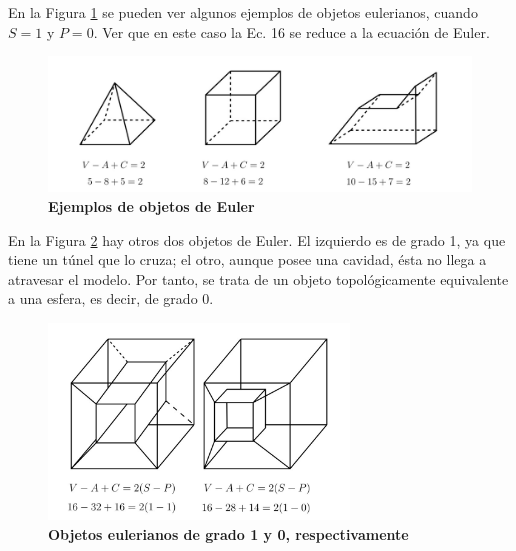 En la Figura \ref{fig:euler1} se pueden ver algunos ejemplos de objetos eulerianos, cuando $S = 1$ y $P = 0$. Ver que en este caso la Ec. 16 se reduce a la ecuación de Euler.

\begin{figure}[h]
\includegraphics[width=14cm]{Img/GEO/geo-euler1.jpg}
\centering
\caption{\textbf{{Ejemplos de objetos de Euler}}}
\label{fig:euler1}
\end{figure}


En la Figura \ref{fig:euler2} hay otros dos objetos de Euler. El izquierdo es de grado 1, ya que tiene un túnel que lo cruza; el otro, aunque posee una cavidad, ésta no llega a atravesar el modelo. Por tanto, se trata de un objeto topológicamente equivalente a una esfera, es decir, de grado 0.

\begin{figure}[h]
\includegraphics[width=8cm]{Img/GEO/geo-euler2.jpg}
\centering
\caption{\textbf{\footnotesize{Objetos eulerianos de grado 1 y 0, respectivamente}}}
\label{fig:euler2}
\end{figure}

